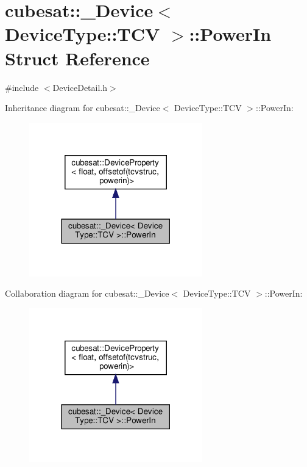 \hypertarget{structcubesat_1_1__Device_3_01DeviceType_1_1TCV_01_4_1_1PowerIn}{}\section{cubesat\+:\+:\+\_\+\+Device$<$ Device\+Type\+:\+:T\+CV $>$\+:\+:Power\+In Struct Reference}
\label{structcubesat_1_1__Device_3_01DeviceType_1_1TCV_01_4_1_1PowerIn}


{\ttfamily \#include $<$Device\+Detail.\+h$>$}



Inheritance diagram for cubesat\+:\+:\+\_\+\+Device$<$ Device\+Type\+:\+:T\+CV $>$\+:\+:Power\+In\+:\nopagebreak
\begin{figure}[H]
\begin{center}
\leavevmode
\includegraphics[width=213pt]{structcubesat_1_1__Device_3_01DeviceType_1_1TCV_01_4_1_1PowerIn__inherit__graph}
\end{center}
\end{figure}


Collaboration diagram for cubesat\+:\+:\+\_\+\+Device$<$ Device\+Type\+:\+:T\+CV $>$\+:\+:Power\+In\+:\nopagebreak
\begin{figure}[H]
\begin{center}
\leavevmode
\includegraphics[width=213pt]{structcubesat_1_1__Device_3_01DeviceType_1_1TCV_01_4_1_1PowerIn__coll__graph}
\end{center}
\end{figure}
